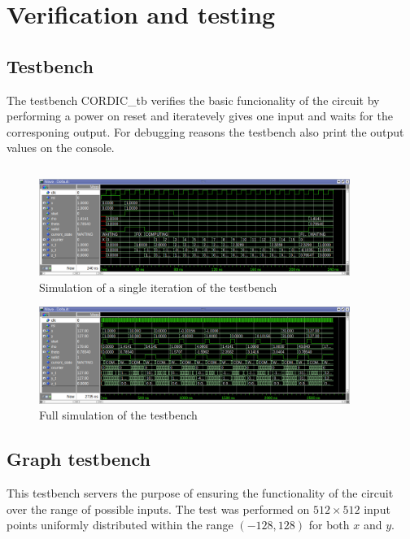 \chapter{Verification and testing}
\label{chap:utlization_report}

\section{Testbench}
The testbench CORDIC\_tb verifies the basic funcionality of the circuit by performing a power on reset and iteratevely gives one input and waits for the corresponing output. For debugging reasons the testbench also print the output values on the console.

\begin{code}
    \inputminted{vhdl}{../vhdl/tb/CORDIC_tb.vhd}
    \label{code:testbench}
\end{code}

\begin{figure}[!ht]
    \centering
    \includegraphics[width=0.9\textwidth]{./images/Verification/wavesmall.png}
    \caption{Simulation of a single iteration of the testbench}
    \label{fig:wavesmall}
\end{figure}

\begin{figure}[!ht]
    \centering
    \includegraphics[width=0.9\textwidth]{./images/Verification/wavebig.png}
    \caption{Full simulation of the testbench}
    \label{fig:wavebig}
\end{figure}


\section{Graph testbench}
This testbench servers the purpose of ensuring the functionality of the circuit over the range of possible inputs. The test was performed on \( 512 \times 512 \)  input points uniformly distributed within the range \( (-128, 128) \) for both \( x \) and \( y \).

